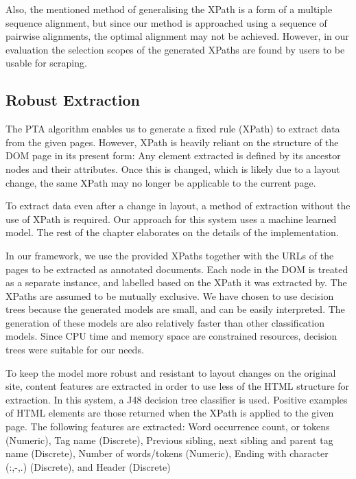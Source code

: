 Also, the mentioned method of generalising the XPath is a form of a multiple sequence alignment,
but since our method is approached using a sequence of pairwise alignments, the optimal alignment may
not be achieved. However, in our evaluation the selection scopes of the generated XPaths are found by
users to be usable for scraping.

\subsection{Robust Extraction}
\label{section:extraction}
The PTA algorithm enables us to generate a fixed rule (XPath) to extract data from the given pages.
However, XPath is heavily reliant on the structure of the DOM page in its present form: Any element
extracted is defined by its ancestor nodes and their attributes. Once this is changed, which is
likely due to a layout change, the same XPath may no longer be applicable to the current page. 

To extract data even after a change in layout, a method of extraction
without the use of XPath is required. Our approach for this system uses a machine learned model.
The rest of the chapter elaborates on the details of the implementation.

In our framework, we use the provided XPaths together with the URLs of the pages to be extracted
as annotated documents. Each node in the DOM is treated as a separate instance, and labelled
based on the XPath it was extracted by. The XPaths are assumed to be mutually exclusive. We have
chosen to use decision trees because the generated models are small, and can be easily interpreted.
The generation of these models are also relatively faster than other classification models. Since
CPU time and memory space are constrained resources, decision trees were suitable for our needs.

	To keep the model more robust and resistant to layout changes on the original site,
content features are extracted in order to use less of the HTML structure for extraction.
In this system, a J48 decision tree classifier is used. Positive examples of HTML
elements are those returned when the XPath is applied to the given page.
The following features are extracted:
Word occurrence count, or tokens (Numeric),
Tag name (Discrete),
Previous sibling, next sibling and parent tag name (Discrete),
Number of words/tokens (Numeric),
Ending with character (:,-,.) (Discrete),
and Header (Discrete)
	

